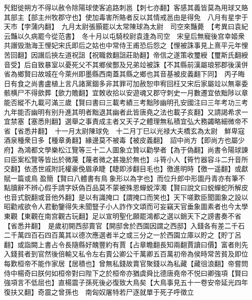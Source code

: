 髠鉗徙朔方不得以赦令除陽球使客追路刺邕【刺七亦翻】客感其義皆莫為用球又賂其部主【部主州牧郡守也】使加毒害所賂者反以其情戒邕由是得免　八月有星孛于天市【孛蒲内翻】　九月太尉張顥罷以太常陳球為太尉　司空來豔薨　【考異曰袁紀云豔以久病罷今從范書】　冬十月以屯騎校尉袁逢為司空　宋皇后無寵後宫幸姬衆共譖毁渤海王悝妃宋氏即后之姑也中常侍王甫恐后怨之【悝被誅事見上熹平元年悝苦回翻】因譖后挾左道祝詛【祝職救翻詛莊助翻】帝信之遂策收璽綬【璽斯氏翻綬音受】后自致暴室以憂死父不其鄉侯酆及兄弟竝被誅【不其縣前漢屬琅邪郡後漢併省為鄉賢曰故城在今萊州即墨縣西南蓋其縣之鄉也其音基被皮義翻下同】　丙子晦日有食之尚書盧植上言凡諸黨錮多非其罪可加赦恕申宥回枉又宋后家屬竝以無辜委骸横尸不得歛葬【歛力贍翻】宜敇收拾以安遊魂又郡守刺史一月數遷宜依黜陟以章能否縱不九載可滿三歲【賢曰書曰三載考績三考黜陟幽明孔安國注曰三年考功三考九年能否幽明有别升進其明者黜退其幽者此皆唐堯之法也載子亥翻】又請謁希求一宜禁塞【塞悉則翻】選舉之事責成主者又天子之體理無私積宜弘大務蠲略細微帝不省【省悉井翻】　十一月太尉陳球免　十二月丁巳以光禄大夫橋玄為太尉　鮮卑寇酒泉種衆日多【種章勇翻】緣邊莫不被毒【被皮義翻】　詔中尚方【即尚方也屬少府】為鴻都文學樂松江覽等三十二人圖象立贊以勸學者【為于偽翻】尚書令陽球諫曰臣案松覽等皆出於微蔑【蔑者微之甚幾於無也】斗筲小人【筲竹器容斗二升音所交翻】依憑世戚附託權豪俛眉承睫【睫即涉翻目毛也】徼進明時【徼一遥翻】或獻賦一篇或鳥盈簡【賢曰八體書有鳥象形以為字也】而位升郎中形圖丹青亦有筆不點牘辭不辨心假手請字妖偽百品莫不蒙被殊恩蟬蜕滓濁【賢曰說文曰蜕蟬蛇所解皮也音式鋭翻或音他外翻】是以有識掩口【謂掩口而笑也】天下嗟歎臣聞圖象之設以昭勸戒欲令人君動鑒得失未聞豎子小人詐作文頌而可妄竊天官垂象圖素者也今太學東觀【東觀在南宫觀古玩翻】足以宣明聖化願罷鴻都之選以銷天下之謗書奏不省【省悉井翻】　是歲初開西邸賣官【開邸舍於西園因謂之西邸】入錢各有差二千石二千萬四百石四百萬其以德次應選者半之或三分之一於西園立庫以貯之【貯丁呂翻】或詣闕上書占令長隨縣好醜豐約有賈【占章瞻翻長知兩翻賈讀曰價】富者則先入錢貧者到官然後倍輸又私令左右賣公卿公千萬卿五百萬初帝為侯時常苦貧及即位每歎桓帝不能作家居【居積也】曾無私錢故賣官聚錢以為私藏【藏徂浪翻】帝嘗問侍中楊奇曰朕何如桓帝對曰陛下之於桓帝亦猶虞舜比德唐堯帝不悦曰卿強項【賢曰強項言不低屈也】直楊震子孫死後必復致大鳥矣【大鳥事見五十一卷安帝延光四年復扶又翻】奇震之曾孫也　南匈奴屠特若尸逐就單于死子呼徵立

